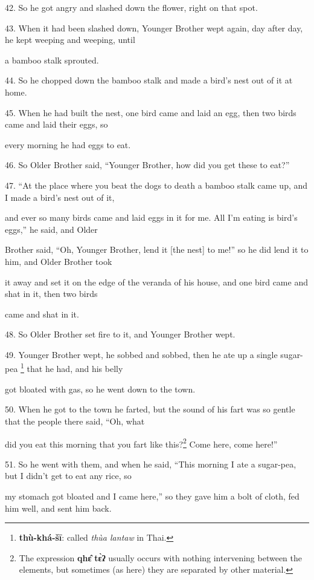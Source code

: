 42. So he got angry and slashed down the flower, right on that spot.

43. When it had been slashed down, Younger Brother wept again, day after day, he
kept weeping and weeping, until

a bamboo stalk sprouted.

44. So he chopped down the bamboo stalk and made a bird's nest out of it at home.

45. When he had built the nest, one bird came and laid an egg, then two birds came
and laid their eggs, so

every morning he had eggs to eat.

46. So Older Brother said, ``Younger Brother, how did you get these to eat?''

47. ``At the place where you beat the dogs to death a bamboo stalk came up, and
I made a bird's nest out of it,

and ever so many birds came and laid eggs in it for me. All I'm eating is bird's
eggs,'' he said, and Older

Brother said, ``Oh, Younger Brother, lend it [the nest] to me!'' so he did lend
it to him, and Older Brother took

it away and set it on the edge of the veranda of his house, and one bird came and
shat in it, then two birds

came and shat in it.

48. So Older Brother set fire to it, and Younger Brother wept.

49. Younger Brother wept, he sobbed and sobbed, then he ate up a single sugar-pea
\footnote{\textbf{thù-khá-šī}: called \textit{thùa lantaw} in Thai.} that he had, and his belly

got bloated with gas, so he went down to the town.

50. When he got to the town he farted, but the sound of his fart was so gentle
that the people there said, ``Oh, what

did you eat this morning that you fart like this?\footnote{The expression \textbf{qhɛ̂} \textbf{tɛ̀ʔ} usually occurs with nothing intervening between the elements, but sometimes (as here) they are separated by other material.} Come here, come here!''

51. So he went with them, and when he said, ``This morning I ate a sugar-pea, but
I didn't get to eat any rice, so

my stomach got bloated and I came here,'' so they gave him a bolt of cloth, fed
him well, and sent him back.

